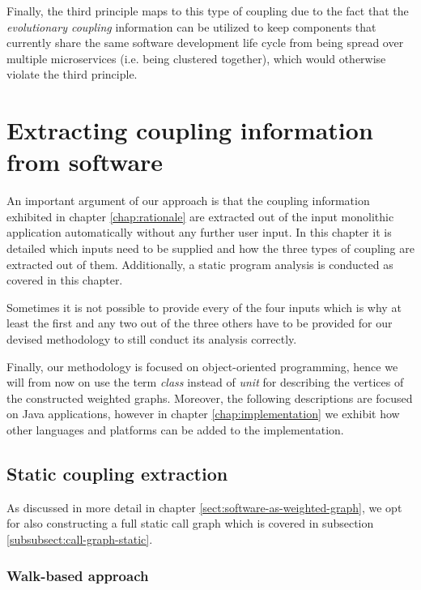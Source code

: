 \documentclass[12pt,a4paper]{report}
\begin{document}
Finally, the third principle maps to this type of coupling due to the fact that
the \textit{evolutionary coupling} information can be utilized to keep
components that currently share the same software development life cycle
from being spread over multiple microservices (i.e. being clustered together),
which would otherwise violate the third principle.




\chapter{Extracting coupling information from software} \label{chap:extracting-coupling}

An important argument of our approach is that the coupling information
exhibited in chapter \ref{chap:rationale} are extracted out of the input
monolithic application automatically without any further user input.
In this chapter it is detailed which inputs need to be supplied and
how the three types of coupling are extracted out of them. Additionally,
a static program analysis is conducted as covered in this chapter.

Sometimes it is not possible to provide every of the four inputs which is why
at least the first and any two out of the three others have to be provided for our devised
methodology to still conduct its analysis correctly.

Finally, our methodology is focused on object-oriented programming,
hence we will from now on use the term \textit{class} instead of \textit{unit}
for describing the vertices of the constructed weighted graphs.
Moreover, the following descriptions are focused on Java applications,
however in chapter \ref{chap:implementation} we exhibit how other
languages and platforms can be added to the implementation.



\section{Static coupling extraction} \label{sect:static-coupling-extraction}

As discussed in more detail in chapter \ref{sect:software-as-weighted-graph},
we opt for also constructing a full static call graph which is covered
in subsection \ref{subsubsect:call-graph-static}.


\subsection{Walk\hyp based approach}
\end{document}
